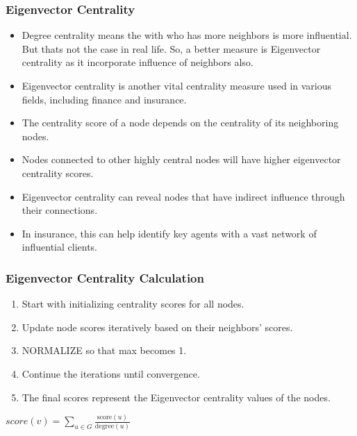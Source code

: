 \begin{frame}[fragile]\frametitle{Eigenvector Centrality}
\begin{itemize}
\item Degree centrality means the with who has more neighbors is more influential. But thats not the case in real life. So, a better measure is Eigenvector centrality as it incorporate influence of neighbors also.
\item Eigenvector centrality is another vital centrality measure used in various fields, including finance and insurance.
\item The centrality score of a node depends on the centrality of its neighboring nodes.
\item Nodes connected to other highly central nodes will have higher eigenvector centrality scores.
\item Eigenvector centrality can reveal nodes that have indirect influence through their connections.
\item In insurance, this can help identify key agents with a vast network of influential clients.
\end{itemize}
\end{frame}

\begin{frame}[fragile]\frametitle{Eigenvector Centrality Calculation}
\begin{enumerate}
\item Start with initializing centrality scores for all nodes.
\item Update node scores iteratively based on their neighbors' scores.
\item NORMALIZE so that max becomes 1.
\item Continue the iterations until convergence.
\item The final scores represent the Eigenvector centrality values of the nodes.
\end{enumerate}

$score(v) = \sum_{u \in G} \frac{\text{score}(u)}{\text{degree}(u)}$


\end{frame}

